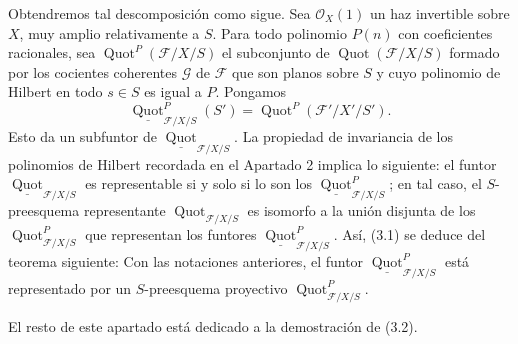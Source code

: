 Obtendremos tal descomposición como sigue. Sea $\mathcal O_X(1)$ un haz
invertible sobre $X$, muy amplio relativamente a $S$. Para todo polinomio
$P(n)$ con coeficientes racionales, sea
$\operatorname{Quot}^P(\mathcal F/X/S)$ el subconjunto de
$\operatorname{Quot}(\mathcal F/X/S)$ formado por los cocientes coherentes
$\mathcal G$ de $\mathcal F$ que son planos sobre $S$ y cuyo polinomio de
Hilbert en todo $s\in S$ es igual a $P$. Pongamos
\[
\underline{\operatorname{Quot}}^P_{\mathcal F/X/S}(S')
=\operatorname{Quot}^P(\mathcal F'/X'/S').
\]
Esto da un subfuntor de
$\underline{\operatorname{Quot}}_{\mathcal F/X/S}$. La propiedad de
invariancia de los polinomios de Hilbert recordada en el Apartado 2 implica lo
siguiente: el funtor $\underline{\operatorname{Quot}}_{\mathcal F/X/S}$ es
representable si y solo si lo son los
$\underline{\operatorname{Quot}}^P_{\mathcal F/X/S}$; en tal caso, el
$S$-preesquema representante $\operatorname{Quot}_{\mathcal F/X/S}$ es
isomorfo a la unión disjunta de los
$\operatorname{Quot}^P_{\mathcal F/X/S}$ que representan los funtores
$\underline{\operatorname{Quot}}^P_{\mathcal F/X/S}$. Así, (3.1) se deduce
del teorema siguiente:
 Con las notaciones anteriores, el funtor
$\underline{\operatorname{Quot}}^P_{\mathcal F/X/S}$ está representado por un
$S$-preesquema proyectivo $\operatorname{Quot}^P_{\mathcal F/X/S}$.

El resto de este apartado está dedicado a la demostración de (3.2).

